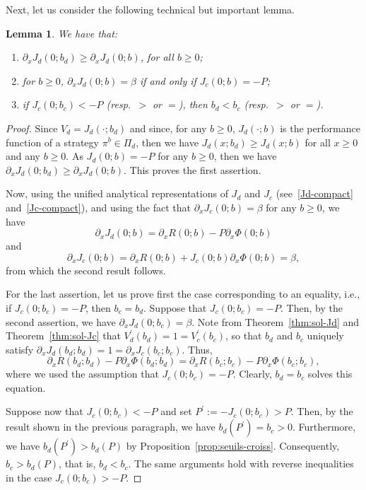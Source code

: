 \documentclass[11pt,reqno]{amsart}
\newtheorem{lemma}[theorem]{Lemma}
\newcommand{\delx}{\partial_x}
\renewcommand{\geq}{\geqslant}
\begin{document}
Next, let us consider the following technical but important lemma.
\begin{lemma}\label{lem-delxJd}
    We have that:
    \begin{enumerate}
        \item $\delx J_d(0;b_d) \geq \delx J_d(0;b)$, for all $b\geq 0$;
        \item for $b\geq 0$, $\delx J_d(0;b) =\beta$ if and only if $J_c(0;b) = -P$;
        \item if $J_c(0;b_c) < -P$ (resp.\ $>$ or $=$), then $b_d < b_c$ (resp.\ $>$ or $=$).
    \end{enumerate}
\end{lemma}
\begin{proof}
Since $V_d = J_d(\cdot;b_d)$ and since, for any $b\geq 0$, $J_d(\cdot;b)$ is the performance function of a strategy $\pi^b \in \Pi_d$, then we have $J_d(x;b_d) \geq J_d(x;b)$ for all $x \geq 0$ and any $b\geq 0$. As $J_d(0;b)=-P$ for any $b \geq 0$, then we have $\delx J_d(0;b_d) \geq \delx J_d(0;b)$. This proves the first assertion.
    
Now, using the unified analytical representations of $J_d$ and $J_c$ (see~\eqref{Jd-compact} and~\eqref{Jc-compact}), and using the fact that $\delx J_c(0;b)=\beta$ for any $b \geq 0$, we have
\begin{equation}
\delx J_d(0;b) = \delx R(0;b) - P \delx\Phi(0;b)
\end{equation}
and
\begin{equation}
\delx J_c(0;b) = \delx R(0;b) + J_c(0;b) \delx\Phi(0;b) = \beta ,
\end{equation}
from which the second result follows.
    
For the last assertion, let us prove first the case corresponding to an equality, i.e., if $J_c(0;b_c) = -P$, then $b_c=b_d$. Suppose that $J_c(0;b_c) = -P$. Then, by the second assertion, we have $\delx J_d(0;b_c) =\beta$. Note from Theorem~\ref{thm:sol-Jd} and Theorem~\ref{thm:sol-Jc} that $V^\prime_d(b_d) = 1 = V^\prime_c(b_c)$, so that $b_d$ and $b_c$ uniquely satisfy $\delx J_d(b_d;b_d) = 1 = \delx J_c(b_c;b_c)$. Thus,
\begin{equation}
\delx R(b_d;b_d) - P\delx\Phi(b_d;b_d) = \delx R(b_c;b_c) - P\delx\Phi(b_c;b_c),  
\end{equation}
where we used the assumption that $J_c(0;b_c) = -P$. Clearly, $b_d = b_c$ solves this equation.
    
Suppose now that $J_c(0;b_c) < -P$ and set $P^\prime := -J_c(0;b_c) > P$. Then, by the result shown in the previous paragraph, we have $b_d(P^\prime)=b_c > 0$. Furthermore, we have $b_d(P^\prime) > b_d(P)$ by Proposition~\ref{prop:seuils-croiss}. Consequently, $b_c > b_d(P)$, that is, $b_d<b_c$. The same arguments hold with reverse inequalities in the case $J_c(0;b_c) > -P$.
\end{proof}
\end{document}
